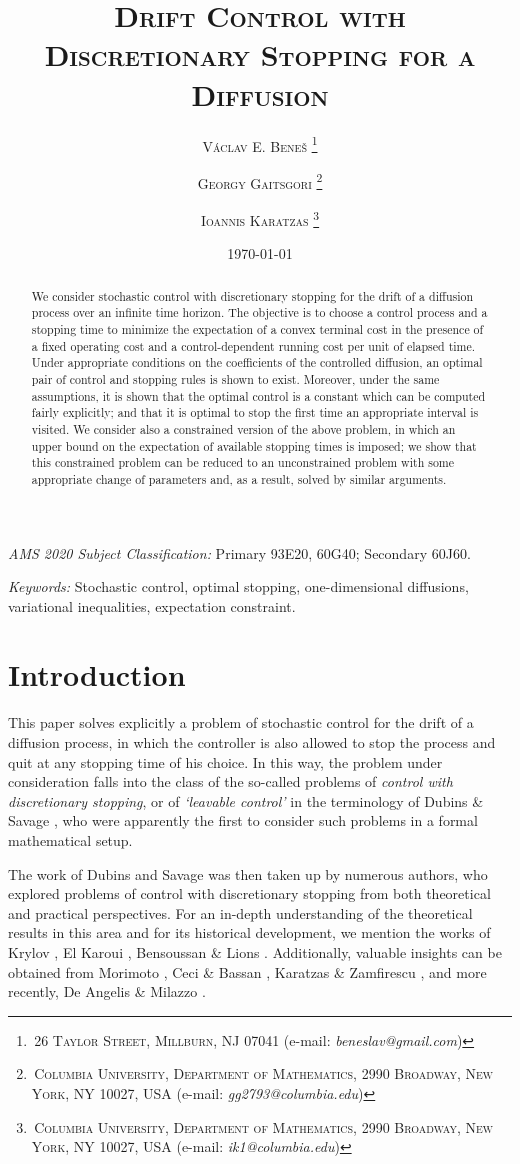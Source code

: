 \documentclass[11pt,tbtags,reqno]{article}
\title{\textsc{Drift Control with Discretionary Stopping for a Diffusion}}
\author{
\textsc{Václav E. Beneš} 
\thanks{ 
\,\textsc{26 Taylor Street, Millburn, NJ 07041} (e-mail: {\it beneslav@gmail.com})}
\and
\textsc{Georgy Gaitsgori} 
\thanks{ 
\,\textsc{Columbia University, Department of Mathematics, 2990 Broadway, New York, NY 10027, USA} (e-mail: {\it gg2793@columbia.edu})}
\and
\textsc{Ioannis Karatzas}
\thanks{ 
\,\textsc{Columbia University, Department of Mathematics, 2990 Broadway, New York, NY 10027, USA} (e-mail: {\it ik1@columbia.edu})}
}
\date{\today}
\theoremstyle{definition}
\numberwithin{equation}{section}
\theoremstyle{definition}
\begin{document}
\maketitle

\begin{abstract}
    We consider stochastic control with discretionary stopping for the drift of a diffusion process over an infinite time horizon. The objective is to choose a control process and a stopping time to minimize the expectation of a convex terminal cost in the presence of a fixed operating cost and a control-dependent running cost per unit of elapsed time. Under appropriate conditions on the coefficients of the controlled diffusion, an optimal pair of control and stopping rules is shown to exist. Moreover, under the same assumptions, it is shown that the optimal control is a constant which can be computed fairly explicitly; and that it is optimal to stop the first time an appropriate interval is visited. 
    We consider also a constrained version of the above problem, in which an upper bound on the expectation of available stopping times is imposed; we show that this constrained problem can be reduced to an unconstrained problem with some appropriate change of parameters and, as a result, solved by similar arguments.
\end{abstract}

\noindent
 {\sl AMS  2020 Subject Classification:}  Primary 93E20, 60G40; Secondary 60J60.

\noindent
 {\sl Keywords:} Stochastic control, optimal stopping, one-dimensional diffusions, variational inequalities, expectation constraint.

\section{Introduction}
This paper solves explicitly a problem of stochastic control for the drift of a diffusion process, in which the controller is also allowed to stop the process and quit at any stopping time of his choice. In this way, the problem under consideration falls into the class of the so-called problems of \textit{control with discretionary stopping}, or of \textit{‘leavable control’} in the terminology of Dubins \& Savage \cite{DubSav65}, who were apparently the first to consider such problems in a formal mathematical setup.

The work of Dubins and Savage was then taken up by numerous authors, who explored problems of control with discretionary stopping from both theoretical and practical perspectives. For an in-depth understanding of the theoretical results in this area and for its historical development, we mention the works of Krylov \cite{Krylov80}, El Karoui \cite{ElKaroui81}, Bensoussan \& Lions \cite{BenLio82}. Additionally, valuable insights can be obtained from Morimoto \cite{Morimoto03}, Ceci \& Bassan \cite{CeciBas04}, Karatzas \& Zamfirescu \cite{KarZamf06}, and more recently, De Angelis \& Milazzo \cite{DeAngMil23}.
 
\end{document}
